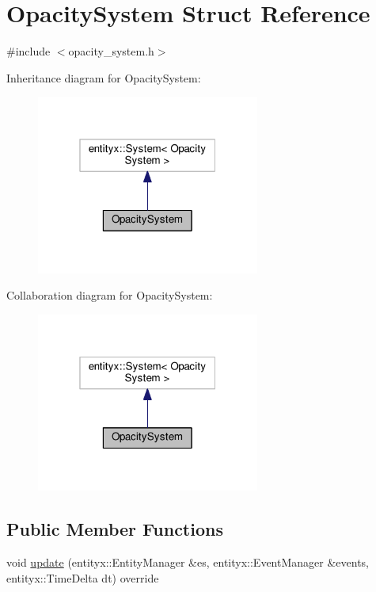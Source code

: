 \hypertarget{structOpacitySystem}{}\section{Opacity\+System Struct Reference}
\label{structOpacitySystem}


{\ttfamily \#include $<$opacity\+\_\+system.\+h$>$}



Inheritance diagram for Opacity\+System\+:
\nopagebreak
\begin{figure}[H]
\begin{center}
\leavevmode
\includegraphics[width=208pt]{structOpacitySystem__inherit__graph}
\end{center}
\end{figure}


Collaboration diagram for Opacity\+System\+:
\nopagebreak
\begin{figure}[H]
\begin{center}
\leavevmode
\includegraphics[width=208pt]{structOpacitySystem__coll__graph}
\end{center}
\end{figure}
\subsection*{Public Member Functions}
\begin{DoxyCompactItemize}
\item 
void \hyperlink{structOpacitySystem_afaf8a988027dcfe4320c119837d10515}{update} (entityx\+::\+Entity\+Manager \&es, entityx\+::\+Event\+Manager \&events, entityx\+::\+Time\+Delta dt) override
\end{DoxyCompactItemize}


